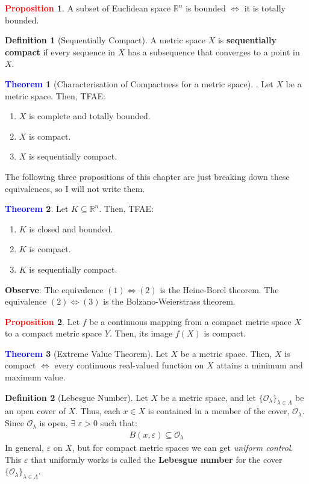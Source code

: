 \documentclass[11pt]{article}
\newcommand{\open}[0]{\mathcal{O}}
\theoremstyle{definition}
\theoremstyle{definition}
\newcommand{\R}[0]{\mathbb{R}}
\newtheorem{theorem}{\textcolor{blue}{Theorem}}
\theoremstyle{definition}
\newtheorem{definition}{\textcolor{OliveGreen}{Definition}}
\newtheorem{prop}{\textcolor{red}{Proposition}}
\theoremstyle{remark}
\begin{document}
\begin{prop}
	A subset of Euclidean space $\R^n$ is bounded $\iff$ it is totally bounded. 
\end{prop}

\begin{definition}[Sequentially Compact]
	A metric space $X$ is \textbf{sequentially compact} if every sequence in $X$ has a subsequence that converges to a point in $X$. 
\end{definition}

\begin{theorem}[Characterisation of Compactness for a metric space]. Let $X$ be a metric space. Then, TFAE: 
\begin{enumerate}[noitemsep]
	\item $X$ is complete and totally bounded. 
	\item $X$ is compact. 
	\item $X$ is sequentially compact. 
\end{enumerate}
\end{theorem}
	The following three propositions of this chapter are just breaking down these equivalences, so I will not write them.
	
\begin{theorem}
	Let $K \subseteq \mathbb{R}^n$. Then, TFAE: 
	\begin{enumerate}[noitemsep]
		\item $K$ is closed and bounded. 
		\item $K$ is compact. 
		\item $K$ is sequentially compact. 
	\end{enumerate}
	\textbf{Observe}: The equivalence $(1) \iff (2)$ is the Heine-Borel theorem. The  equivalence $(2) \iff (3)$ is the Bolzano-Weierstrass theorem.  
\end{theorem} 

\begin{prop}
	Let $f$ be a continuous mapping from a compact metric space $X$ to a compact metric space $Y$. Then, its image $f(X)$ is compact. 
\end{prop}

\begin{theorem}[Extreme Value Theorem]
	Let $X$ be a metric space. Then, $X$ is compact $\iff$ every continuous real-valued function on $X$ attains a minimum and maximum value. 
\end{theorem}

\begin{definition}[Lebesgue Number]
	Let $X$ be a metric space, and let $\{ \open_\lambda \}_{\lambda \in \Lambda}$ be an open cover of $X$. Thus, each $x \in X$ is contained in a member of the cover, $\open_\lambda$. Since $\open_\lambda$ is open, $\exists$ $\varepsilon > 0$ such that: 
	\begin{align*}
		B(x, \varepsilon) \subseteq \open_\lambda 	
	\end{align*}
	In general, $\varepsilon$ on $X$, but for compact metric spaces we can get \emph{uniform control}. This $\varepsilon$ that uniformly works is called the \textbf{Lebesgue number} for the cover $\{ \open_\lambda \}_{\lambda \in \Lambda }$. 
\end{definition}
\end{document}

